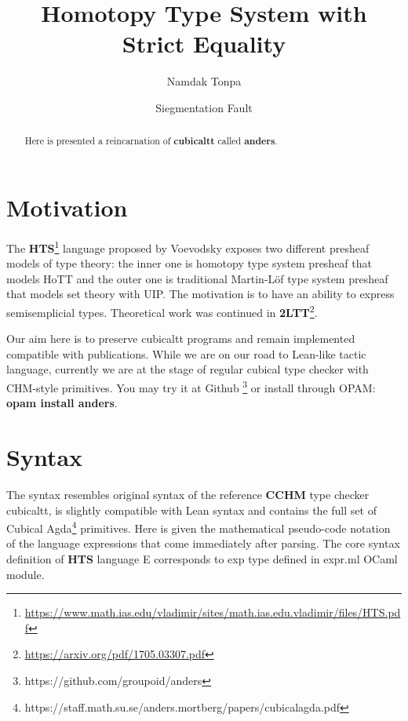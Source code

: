 \documentclass[a4paper,UKenglish,cleveref, autoref, thm-restate]{lipics-v2021}
\title{Homotopy Type System with Strict Equality}
\author{Namdak Tonpa}{Groupoid Infinity}{maxim@synrc.com}{https://orcid.org/0000-0001-7127-8796}{}
\author{Siegmentation Fault}{Groupoid Infinity}{siegmentationfault@yandex.ru}{}{}
\begin{document}
\maketitle

\begin{abstract}
Here is presented a reincarnation of \textbf{cubicaltt} called \textbf{anders}.
\end{abstract}

\section{Motivation}
\label{sec:typesetting-summary}

The \textbf{HTS}\footnote{\url{https://www.math.ias.edu/vladimir/sites/math.ias.edu.vladimir/files/HTS.pdf}}
language proposed by Voevodsky exposes two different presheaf models of type theory:
the inner one is homotopy type system presheaf that models HoTT and the outer one is traditional Martin-Löf
type system presheaf that models set theory with UIP. The motivation is to have an ability to
express semisemplicial types. Theoretical work was continued in \textbf{2LTT}\footnote{\url{https://arxiv.org/pdf/1705.03307.pdf}}.

Our aim here is to preserve cubicaltt programs and remain implemented compatible with publications.
While we are on our road to Lean-like tactic language, currently we are at the stage of regular cubical type
checker with CHM-style primitives. You may try it at Github \footnote{https://github.com/groupoid/anders}
or install through OPAM: \textbf{opam install anders}.

\section{Syntax}

The syntax resembles original syntax of the reference \textbf{CCHM} type checker cubicaltt,
is slightly compatible with Lean syntax and contains the full set of Cubical
Agda\footnote{https://staff.math.su.se/anders.mortberg/papers/cubicalagda.pdf} primitives.
Here is given the mathematical pseudo-code notation of the language expressions that come
immediately after parsing. The core syntax definition of \textbf{HTS} language E
corresponds to exp type defined in expr.ml OCaml module.
\end{document}

